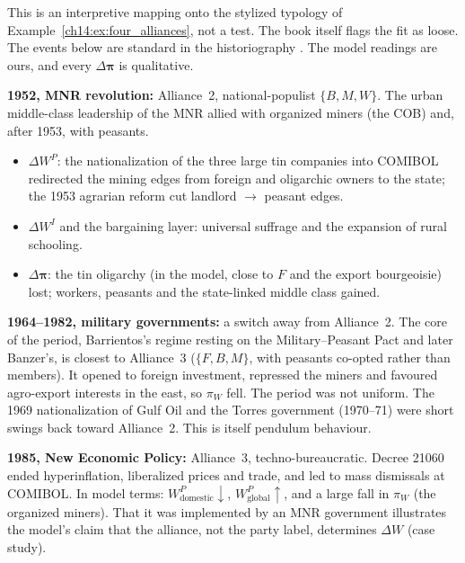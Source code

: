 \documentclass[../solutions_manual.tex]{subfiles}
\begin{document}
This is an interpretive mapping onto the stylized typology of Example~\ref{ch14:ex:four_alliances}, not a test. The book itself flags the fit as loose. The events below are standard in the historiography \citep[e.g.][]{klein2011concise,dunkerley1984rebellion}. The model readings are ours, and every $\Delta\boldsymbol{\pi}$ is qualitative.

 \textbf{1952, MNR revolution:} Alliance~2, national-populist $\{B, M, W\}$. The urban middle-class leadership of the MNR allied with organized miners (the COB) and, after 1953, with peasants.
\begin{itemize}
\item $\Delta W^P$: the nationalization of the three large tin companies into COMIBOL redirected the mining edges from foreign and oligarchic owners to the state; the 1953 agrarian reform cut landlord $\to$ peasant edges.
\item $\Delta W^I$ and the bargaining layer: universal suffrage and the expansion of rural schooling.
\item $\Delta\boldsymbol{\pi}$: the tin oligarchy (in the model, close to $F$ and the export bourgeoisie) lost; workers, peasants and the state-linked middle class gained.
\end{itemize}

 \textbf{1964--1982, military governments:} a switch away from Alliance~2. The core of the period, Barrientos's regime resting on the Military--Peasant Pact and later Banzer's, is closest to Alliance~3 ($\{F, B, M\}$, with peasants co-opted rather than members). It opened to foreign investment, repressed the miners and favoured agro-export interests in the east, so $\pi_W$ fell. The period was not uniform. The 1969 nationalization of Gulf Oil and the Torres government (1970--71) were short swings back toward Alliance~2. This is itself pendulum behaviour.

 \textbf{1985, New Economic Policy:} Alliance~3, techno-bureaucratic. Decree 21060 ended hyperinflation, liberalized prices and trade, and led to mass dismissals at COMIBOL. In model terms: $W^P_{\text{domestic}}\downarrow$, $W^P_{\text{global}}\uparrow$, and a large fall in $\pi_W$ (the organized miners). That it was implemented by an MNR government illustrates the model's claim that the alliance, not the party label, determines $\Delta W$ (case study).
\end{document}
